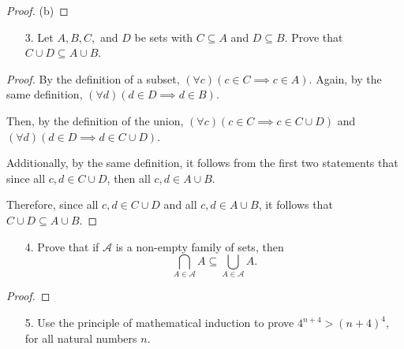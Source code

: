 \documentclass[10pt]{article}
\theoremstyle{definition}
\theoremstyle{plain}
\begin{document}
\begin{proof}{(b)}

\end{proof}



\pagebreak



\begin{enumerate}
  \item[3.] Let $A, B, C,$ and $D$ be sets with $C \subseteq A$ and $D \subseteq B$.  Prove that $C \cup D \subseteq A \cup B$.
\end{enumerate}

\begin{proof}
  By the definition of a subset, $(\forall c)(c\in C \implies c\in A)$. Again, by the same definition, $(\forall d) (d\in D \implies d\in B)$. \\

  \par Then, by the definition of the union, $(\forall c)(c\in C \implies c\in C\cup D)$ and $(\forall d)(d\in D\implies d\in C\cup D)$. \\

  \par Additionally, by the same definition, it follows from the first two statements that since all $c,d\in C\cup D$, then all $c,d \in A\cup B$. \\

  \par Therefore, since all $c,d\in C\cup D$ and all $c,d \in A\cup B$, it follows that $C\cup D \subseteq A\cup B$.
\end{proof}



\pagebreak



\begin{enumerate}
  \item[4.] Prove that if $\mathcal{A}$ is a non-empty family of sets, then $$\bigcap_{A \in \mathcal{A}}A \subseteq \bigcup_{A \in \mathcal{A}} A.$$
\end{enumerate}

\begin{proof}

\end{proof}



\pagebreak



\begin{enumerate}
  \item[5.] Use the principle of mathematical induction to prove $4^{n+4} > (n+4)^4,$ for all natural numbers $n$.
\end{enumerate}
\end{document}
